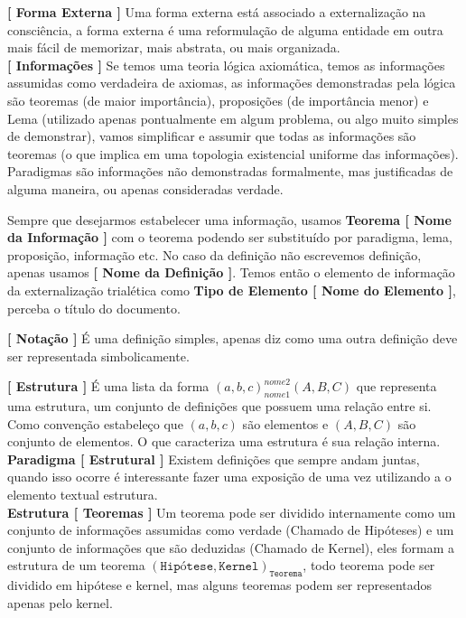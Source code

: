 \documentclass[10pt,a4paper]{report}
\begin{document}
\textbf{[ Forma Externa ]} Uma forma externa está associado a externalização na consciência, a forma externa é uma reformulação de alguma entidade em outra mais fácil de memorizar, mais abstrata, ou mais organizada. \\

\textbf{[ Informações ]} Se temos uma teoria lógica axiomática, temos as informações assumidas como verdadeira de axiomas, as informações demonstradas pela lógica são teoremas (de maior importância), proposições (de importância menor) e Lema (utilizado apenas pontualmente em algum problema, ou algo muito simples de demonstrar), vamos simplificar e assumir que todas as informações são teoremas (o que implica em uma topologia existencial uniforme das informações). Paradigmas são informações não demonstradas formalmente, mas justificadas de alguma maneira, ou apenas consideradas verdade.

\hspace{\baselineskip}

Sempre que desejarmos estabelecer uma informação, usamos \textbf{Teorema [ Nome da Informação ]} com o teorema podendo ser substituído por paradigma, lema, proposição, informação etc. No caso da definição não escrevemos definição, apenas usamos \textbf{[ Nome da Definição ]}. Temos então o elemento de informação da externalização trialética como \textbf{Tipo de Elemento [ Nome do Elemento ]}, perceba o título do documento.

\hspace{\baselineskip}

\textbf{[ Notação ]} É uma definição simples, apenas diz como uma outra definição deve ser representada simbolicamente.

\hspace{\baselineskip}

\textbf{[ Estrutura ]} É uma lista da forma $(a,b,c)_{nome1}^{nome2}(A,B,C)$ que representa uma estrutura, um conjunto de definições que possuem uma relação entre si. Como convenção estabeleço que $(a,b,c)$ são elementos e $(A,B,C)$ são conjunto de elementos. O que caracteriza uma estrutura é sua relação interna.\\

\textbf{Paradigma [ Estrutural ]} Existem definições que sempre andam juntas, quando isso ocorre é interessante fazer uma exposição de uma vez utilizando a o elemento textual estrutura. \\

\textbf{Estrutura [ Teoremas ]} Um teorema pode ser dividido internamente como um conjunto de informações assumidas como verdade (Chamado de Hipóteses)  e um conjunto de informações que são deduzidas (Chamado de Kernel), eles formam a estrutura de um teorema $(\texttt{Hipótese}, \texttt{Kernel})_{\texttt{Teorema}}$, todo teorema pode ser dividido em hipótese e kernel, mas alguns teoremas podem ser representados apenas pelo kernel.\\
\end{document}
